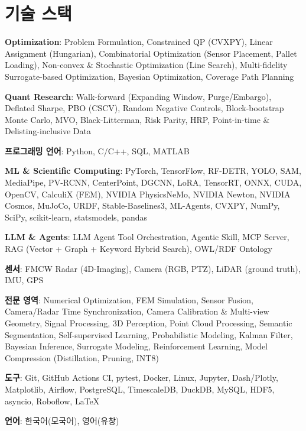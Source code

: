 \documentclass[a4paper,11pt]{article}
\begin{document}
\section{기술 스택}
 \begin{itemize}[leftmargin=0.15in, label={}, itemsep=0pt, parsep=0pt, topsep=0pt]
    \small{\item{\textbf{Optimization}{: Problem Formulation, Constrained QP (CVXPY), Linear Assignment (Hungarian), Combinatorial Optimization (Sensor Placement, Pallet Loading), Non-convex \& Stochastic Optimization (Line Search), Multi-fidelity Surrogate-based Optimization, Bayesian Optimization, Coverage Path Planning}}}
    \small{\item{\textbf{Quant Research}{: Walk-forward (Expanding Window, Purge/Embargo), Deflated Sharpe, PBO (CSCV), Random Negative Controls, Block-bootstrap Monte Carlo, MVO, Black-Litterman, Risk Parity, HRP, Point-in-time \& Delisting-inclusive Data}}}
    \small{\item{\textbf{프로그래밍 언어}{: Python, C/C++, SQL, MATLAB}}}
    \small{\item{\textbf{ML \& Scientific Computing}{: PyTorch, TensorFlow, RF-DETR, YOLO, SAM, MediaPipe, PV-RCNN, CenterPoint, DGCNN, LoRA, TensorRT, ONNX, CUDA, OpenCV, CalculiX (FEM), NVIDIA PhysicsNeMo, NVIDIA Newton, NVIDIA Cosmos, MuJoCo, URDF, Stable-Baselines3, ML-Agents, CVXPY, NumPy, SciPy, scikit-learn, statsmodels, pandas}}}
    \small{\item{\textbf{LLM \& Agents}{: LLM Agent Tool Orchestration, Agentic Skill, MCP Server, RAG (Vector + Graph + Keyword Hybrid Search), OWL/RDF Ontology}}}
    \small{\item{\textbf{센서}{: FMCW Radar (4D-Imaging), Camera (RGB, PTZ), LiDAR (ground truth), IMU, GPS}}}
    \small{\item{\textbf{전문 영역}{: Numerical Optimization, FEM Simulation, Sensor Fusion, Camera/Radar Time Synchronization, Camera Calibration \& Multi-view Geometry, Signal Processing, 3D Perception, Point Cloud Processing, Semantic Segmentation, Self-supervised Learning, Probabilistic Modeling, Kalman Filter, Bayesian Inference, Surrogate Modeling, Reinforcement Learning, Model Compression (Distillation, Pruning, INT8)}}}
    \small{\item{\textbf{도구}{: Git, GitHub Actions CI, pytest, Docker, Linux, Jupyter, Dash/Plotly, Matplotlib, Airflow, PostgreSQL, TimescaleDB, DuckDB, MySQL, HDF5, asyncio, Roboflow, \LaTeX}}}
    \small{\item{\textbf{언어}{: 한국어(모국어), 영어(유창)}}}
 \end{itemize}
\end{document}
